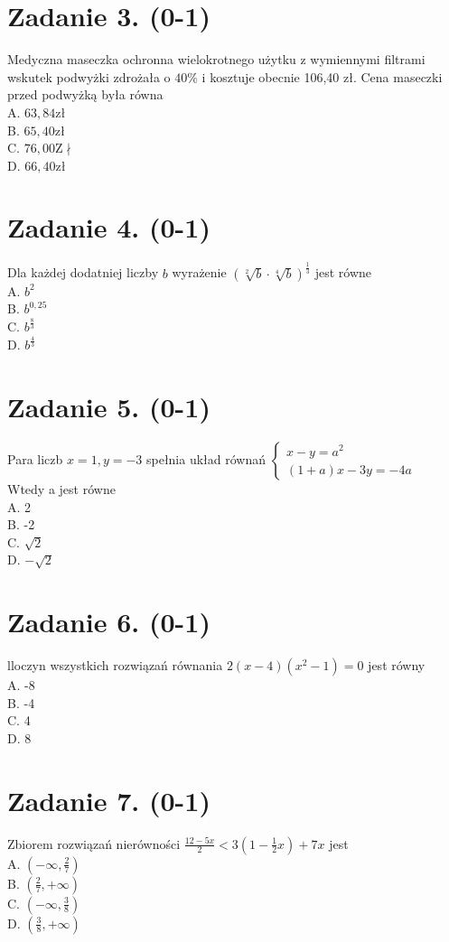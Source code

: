 \documentclass[10pt]{article}
\begin{document}
\section*{Zadanie 3. (0-1)}
Medyczna maseczka ochronna wielokrotnego użytku z wymiennymi filtrami wskutek podwyżki zdrożała o \(40 \%\) i kosztuje obecnie 106,40 zł. Cena maseczki przed podwyżką była równa\\
A. \(63,84 \mathrm{zł}\)\\
B. \(65,40 \mathrm{zł}\)\\
C. \(76,00 \mathrm{Z} \nmid\)\\
D. \(66,40 \mathrm{zł}\)

\section*{Zadanie 4. (0-1)}
Dla każdej dodatniej liczby \(b\) wyrażenie \((\sqrt[2]{b} \cdot \sqrt[4]{b})^{\frac{1}{3}}\) jest równe\\
A. \(b^{2}\)\\
B. \(b^{0,25}\)\\
C. \(b^{\frac{8}{3}}\)\\
D. \(b^{\frac{4}{3}}\)

\section*{Zadanie 5. (0-1)}
Para liczb \(x=1, y=-3\) spełnia układ równań \(\left\{\begin{array}{l}x-y=a^{2} \\ (1+a) x-3 y=-4 a\end{array}\right.\)\\
Wtedy a jest równe\\
A. 2\\
B. -2\\
C. \(\sqrt{2}\)\\
D. \(-\sqrt{2}\)

\section*{Zadanie 6. (0-1)}
lloczyn wszystkich rozwiązań równania \(2(x-4)\left(x^{2}-1\right)=0\) jest równy\\
A. -8\\
B. -4\\
C. 4\\
D. 8

\section*{Zadanie 7. (0-1)}
Zbiorem rozwiązań nierówności \(\frac{12-5 x}{2}<3\left(1-\frac{1}{2} x\right)+7 x\) jest\\
A. \(\left(-\infty, \frac{2}{7}\right)\)\\
B. \(\left(\frac{2}{7},+\infty\right)\)\\
C. \(\left(-\infty, \frac{3}{8}\right)\)\\
D. \(\left(\frac{3}{8},+\infty\right)\)
\end{document}
